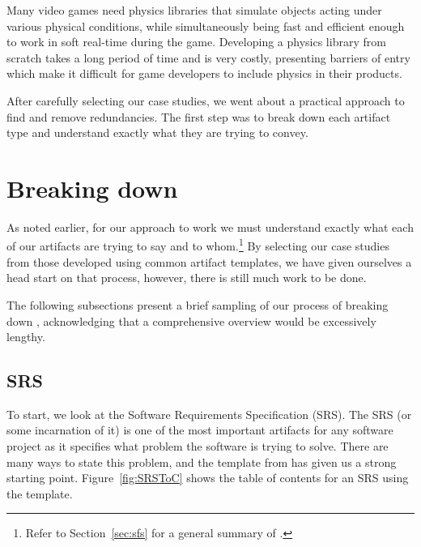 \card{\gp}
{Many video games need physics libraries that simulate 
 objects acting under various physical conditions, while simultaneously being 
 fast and efficient enough to work in soft real-time during the game. 
 Developing a physics library from scratch takes a long period of time and is 
 very costly, presenting barriers of entry which make it difficult for game 
 developers to include physics in their products.}
{}

After carefully selecting our case studies, we went about a practical approach
to find and remove redundancies. The first step was to break down each artifact
type and understand exactly what they are trying to convey.


\section{Breaking down \sfs}
\label{sec:breakdown}

As noted earlier, for our approach to work we must understand exactly what each
of our artifacts are trying to say and to whom.\footnote{Refer to 
Section~\ref{sec:sfs} for a general summary of \sfs{}.} By selecting our case 
studies from those developed using common artifact templates, we have given 
ourselves a head start on that process, however, there is still much work to be 
done.

The following subsections present a brief sampling of our process of breaking 
down \sfs{}, acknowledging that a comprehensive overview would be excessively 
lengthy.

\subsection{SRS}
\label{sec:breakdown:srs}

To start, we look at the Software Requirements Specification (SRS). The SRS
(or some incarnation of it) is one of the most important artifacts for any
software project as it specifies what problem the software is trying to solve.
There are many ways to state this problem, and the template from \smithea{} has 
given us a strong starting point. Figure~\ref{fig:SRSToC} shows the table of 
contents for an SRS using the \smithea{} template.

